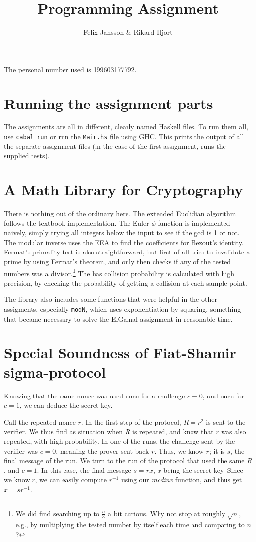 \documentclass{article}
\author{Felix Jansson \& Rikard Hjort}
\title{Programming Assignment}
\begin{document}
The personal number used is 199603177792.

\section{Running the assignment parts}
The assignments are all in different, clearly named Haskell files. To run them
all, use \texttt{cabal run} or run the \texttt{Main.hs} file using GHC. This
prints the output of all the separate assignment files (in the case of the first
assignment, runs the supplied tests).

\section{A Math Library for Cryptography}
There is nothing out of the ordinary here. The extended Euclidian algorithm
follows the textbook implementation. The Euler $\phi$ function is implemented
naively, simply trying all integers below the input to see if the gcd is 1 or
not. The modular inverse uses the EEA to find the coefficients for Bezout's
identity. Fermat's primality test is also straightforward, but first of all
tries to invalidate a prime by using Fermat's theorem, and only then checks if
any of the tested numbers was a divisor.\footnote{We did find searching up to
  $\frac{n}{3}$ a bit curious. Why not stop at roughly $\sqrt{n}$, e.g., by
  multiplying the tested number by itself each time and comparing to $n$?} The
has collision probability is calculated with high precision, by checking the
probability of getting a collision at each sample point.

The library also includes some functions that were helpful in the other
assigments, especially \texttt{modN}, which uses exponentiation by squaring,
something that became necessary to solve the ElGamal assignment in reasonable time.

\section{Special Soundness of Fiat-Shamir sigma-protocol}
Knowing that the same nonce was used once for a challenge $c=0$, and once for
$c=1$, we can deduce the secret key.

Call the repeated nonce $r$. In the first step of the protocol, $R=r^2$ is sent
to the verifier. We thus find as situation when $R$ is repeated, and know that
$r$ was also repeated, with high probability. In one of the runs, the
challenge sent by the verifier was $c=0$, meaning the prover sent back $r$.
Thus, we know $r$; it is $s$, the final message of the run. We turn to the run
of the protocol that used the same $R$, and $c=1$. In this case, the final
message $s=rx$, $x$ being the secret key. Since we know $r$, we can easily
compute $r^{-1}$ using our \textit{modinv} function, and thus get $x=sr^{-1}$.
\end{document}
